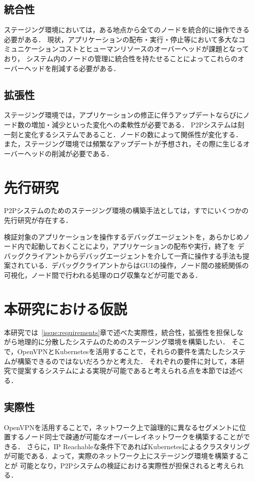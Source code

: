\subsection{統合性}
\label{issue:requirements2}
ステージング環境においては，ある地点から全てのノードを統合的に操作できる必要がある．
現状，アプリケーションの配布・実行・停止等において多大なコミュニケーションコストとヒューマンリソースのオーバーヘッドが課題となっており，
システム内のノードの管理に統合性を持たせることによってこれらのオーバーヘッドを削減する必要がある．

\subsection{拡張性}
\label{issue:requirements3}
ステージング環境では，アプリケーションの修正に伴うアップデートならびにノード数の増加・減少といった変化への柔軟性が必要である．
P2Pシステムは刻一刻と変化するシステムであること．ノードの数によって関係性が変化する．
また，ステージング環境では頻繁なアップデートが予想され，その際に生じるオーバーヘッドの削減が必要である．

\section{先行研究}
\label{issue:previous-research}
P2Pシステムのためのステージング環境の構築手法としては，すでにいくつかの先行研究が存在する．

検証対象のアプリケーションを操作するデバッグエージェントを，あらかじめノード内で起動しておくことにより，アプリケーションの配布や実行，終了を
デバッグクライアントからデバッグエージェントを介して一斉に操作する手法も提案されている．デバッグクライアントからはGUIの操作，ノード間の接続関係の
可視化，ノード間で行われる処理のログ収集などが可能である．

\section{本研究における仮説}
\label{issue:hypothesis}
本研究では~\ref{issue:requirements}章で述べた実際性，統合性，拡張性を担保しながら地理的に分散したシステムのためのステージング環境を構築したい．
そこで，OpenVPNとKubernetesを活用することで，それらの要件を満たしたシステムが構築できるのではないだろうかと考えた．
それぞれの要件に対して，本研究で提案するシステムによる実現が可能であると考えられる点を本節では述べる．

\subsection{実際性}
OpenVPNを活用することで，ネットワーク上で論理的に異なるセグメントに位置するノード同士で疎通が可能なオーバーレイネットワークを構築することができる．
さらに，IP Reachableな条件下であればKubernetesによるクラスタリングが可能である．よって，実際のネットワーク上にステージング環境を構築することが
可能となり，P2Pシステムの検証における実際性が担保されると考えられる．

